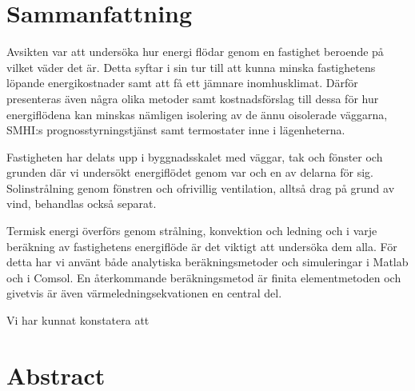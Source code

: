 \chapter*{Sammanfattning}

Avsikten var att undersöka hur energi flödar genom en fastighet beroende på vilket väder det är. Detta syftar i sin tur till att kunna minska fastighetens löpande energikostnader samt att få ett jämnare inomhusklimat. Därför presenteras även några olika metoder samt kostnadsförslag till dessa för hur energiflödena kan minskas nämligen isolering av de ännu oisolerade väggarna, SMHI:s prognosstyrningstjänst samt termostater inne i lägenheterna.

Fastigheten har delats upp i byggnadsskalet med väggar, tak och fönster och grunden där vi undersökt energiflödet genom var och en av delarna för sig. Solinstrålning genom fönstren och ofrivillig ventilation, alltså drag på grund av vind, behandlas också separat.

Termisk energi överförs genom strålning, konvektion och ledning och i varje beräkning av fastighetens energiflöde är det viktigt att undersöka dem alla. För detta har vi använt både analytiska beräkningsmetoder och simuleringar i Matlab och i Comsol. En återkommande beräkningsmetod är finita elementmetoden och givetvis är även värmeledningsekvationen en central del.

Vi har kunnat konstatera att 




\chapter*{Abstract}

\newpage
